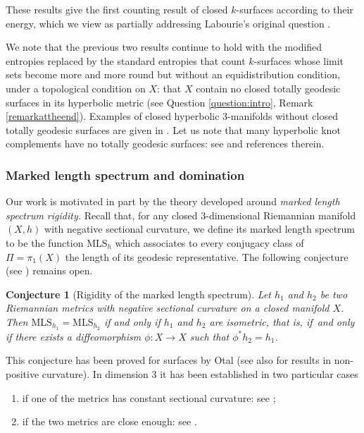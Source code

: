 \documentclass[JEP,XML,SOM,Unicode,NoEqCountersInSection,published]{cedram}
\newcommand{\ksurfaces}{$k$\nobreakdash-surfaces\xspace}
\theoremstyle{plain}
\newtheorem{conjecture}[theorem]{Conjecture}
\theoremstyle{definition}
\newcommand{\MLS}{\mathrm{MLS}}
\begin{document}
These results give the first counting result of closed \ksurfaces according to their energy, which we view as partially addressing Labourie's original question \cite[Quest.\,(ii) p.\,243]{LabourieInvent}.

We note that the previous two results continue to hold with the modified entropies replaced by the standard entropies that count \ksurfaces whose limit sets become more and more round but without an equidistribution condition, under a topological condition on $X$: that $X$ contain no closed totally geodesic surfaces in its hyperbolic metric (see Question \ref{question:intro}, Remark \ref{remarkattheend}). Examples of closed hyperbolic 3-manifolds without closed totally geodesic surfaces are given in \cite{MR03}. Let us note that many hyperbolic knot complements have no totally geodesic surfaces: see \cite{Basilio_Lee_Malionek,Reid} and references therein.


\subsubsection{Marked length spectrum and domination}

Our work is motivated in part by the theory developed around \textit{marked length spectrum rigidity.} Recall that, for any closed $3$\nobreakdash-dimensional Riemannian manifold $(X,h)$ with negative sectional curvature, we define its marked length spectrum to be the function $\MLS_h$ which associates to every conjugacy class of $\Pi=\pi_1(X)$ the length of its geodesic representative. The following conjecture (see \cite[Prob.\,3.1]{BurnsKatok}) remains open.
\begin{conjecture}[Rigidity of the marked length spectrum]
Let $h_1$ and $h_2$ be two Riemannian metrics with negative sectional curvature on a closed manifold $X$. Then $\mathrm{MLS}_{h_1}=\mathrm{MLS}_{h_2}$ if and only if $h_1$ and $h_2$ are isometric, that is, if~and only if there exists a diffeomorphism $\phi:X\to X$ such that $\phi^\ast h_2=h_1$.
\end{conjecture}

This conjecture has been proved for surfaces by Otal \cite{Otal} (see also \cite{Croke} for results in non-positive curvature). In dimension $3$ it has been established in two particular cases
\begin{enumerate}
\item if one of the metrics has constant sectional curvature: see \cite{besson1996minimal,HamenstadtMLS};
\item if the two metrics are close enough: see \cite{GuillarmouLefeuvre}.
\end{enumerate}
\end{document}
